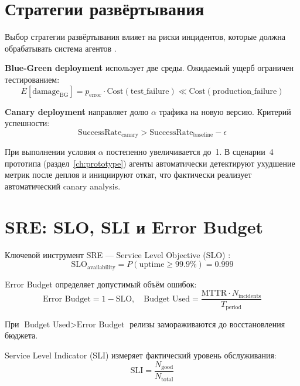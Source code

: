 \section{Стратегии развёртывания}

Выбор стратегии развёртывания влияет на риски инцидентов, которые должна обрабатывать система агентов \cite{chaos_engineering,netflix_chaos}.

\textbf{Blue-Green deployment} использует две среды. Ожидаемый ущерб ограничен тестированием:
\begin{equation}
E[\text{damage}_{\text{BG}}] = p_{\text{error}} \cdot \text{Cost}(\text{test\_failure}) \ll \text{Cost}(\text{production\_failure})
\label{eq:bg_damage}
\end{equation}

\textbf{Canary deployment} направляет долю $\alpha$ трафика на новую версию. Критерий успешности:
\begin{equation}
\text{SuccessRate}_{\text{canary}} > \text{SuccessRate}_{\text{baseline}} - \epsilon
\label{eq:canary_success}
\end{equation}

При выполнении условия $\alpha$ постепенно увеличивается до~1. В сценарии~4 прототипа (раздел~\ref{ch:prototype}) агенты автоматически детектируют ухудшение метрик после деплоя и инициируют откат, что фактически реализует автоматический canary analysis.

\section{SRE: SLO, SLI и Error Budget}

Ключевой инструмент SRE --- Service Level Objective (SLO) \cite{google_sre_book}:
\begin{equation}
\text{SLO}_{\text{availability}} = P(\text{uptime} \geq 99.9\%) = 0.999
\label{eq:slo}
\end{equation}

Error Budget определяет допустимый объём ошибок:
\begin{equation}
\text{Error Budget} = 1 - \text{SLO}, \quad \text{Budget Used} = \frac{\text{MTTR} \cdot N_{\text{incidents}}}{T_{\text{period}}}
\label{eq:error_budget}
\end{equation}

При $\text{Budget Used} > \text{Error Budget}$ релизы замораживаются до восстановления бюджета.

Service Level Indicator (SLI) измеряет фактический уровень обслуживания:
\begin{equation}
\text{SLI} = \frac{N_{\text{good}}}{N_{\text{total}}}
\label{eq:sli}
\end{equation}

